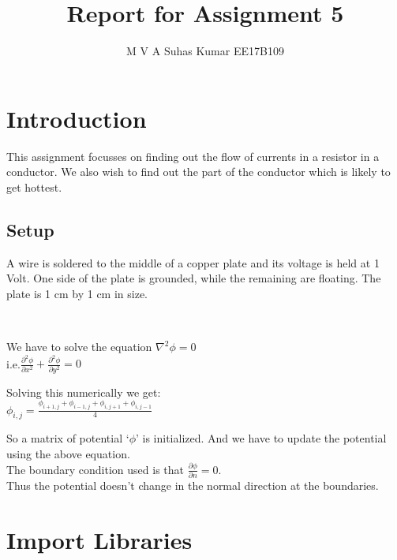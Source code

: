\documentclass[11pt]{article}
\title{Report for Assignment 5}
\author{M V A Suhas Kumar EE17B109}
\begin{document}
    
    
    \maketitle
    
    

    
    \hypertarget{introduction}{%
\section{Introduction}\label{introduction}}

This assignment focusses on finding out the flow of currents in a
resistor in a conductor. We also wish to find out the part of the
conductor which is likely to get hottest.

\hypertarget{setup}{%
\subsection{Setup}\label{setup}}

A wire is soldered to the middle of a copper plate and its voltage is
held at 1 Volt. One side of the plate is grounded, while the remaining
are floating. The plate is 1 cm by 1 cm in size.


    
    \begin{center}
    \end{center}
    { \hspace*{\fill} \\}
    

    We have to solve the equation $\nabla^2{\phi}=0$\\
    i.e.$\frac{\partial^2 \phi}{\partial x^2} + \frac{\partial^2 \phi}{\partial y^2}=0$
     
      Solving this numerically we get:\\
$\phi_{i,j}= \frac{\phi_{i+1,j}+\phi_{i-1,j}+\phi_{i,j+1}+\phi_{i,j-1}}{4}$

So a matrix of potential `\(\phi\)' is initialized. And we have to
update the potential using the above equation. \\The boundary condition
used is that \(\frac{\partial{\phi}}{\partial{n}}=0\).\\ Thus the potential
doesn't change in the normal direction at the boundaries.

    \hypertarget{import-libraries}{%
\section{Import Libraries}\label{import-libraries}}
\end{document}

